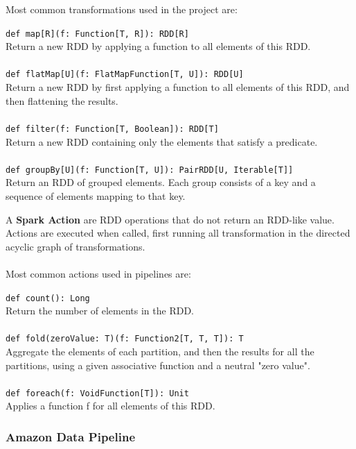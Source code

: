 Most common transformations used in the project are:

\begin{displayquote}
\texttt{def map[R](f: Function[T, R]): RDD[R]}
\\
Return a new RDD by applying a function to all elements of this RDD.
\\\\
\texttt{def flatMap[U](f: FlatMapFunction[T, U]): RDD[U]}
\\
Return a new RDD by first applying a function to all elements of this RDD, and then flattening the results.
\\\\
\texttt{def filter(f: Function[T, Boolean]): RDD[T]}
\\
Return a new RDD containing only the elements that satisfy a predicate.
\\\\
\texttt{def groupBy[U](f: Function[T, U]): PairRDD[U, Iterable[T]]}
\\
Return an RDD of grouped elements. Each group consists of a key and a sequence of elements mapping to that key.
\end{displayquote}

A \textbf{Spark Action} are RDD operations that do not return an RDD-like value. Actions are executed when called, first running all transformation in the directed acyclic graph of transformations.
\\\\
Most common actions used in pipelines are:

\begin{displayquote}
\texttt{def count(): Long}
\\
Return the number of elements in the RDD.
\\\\
\texttt{def fold(zeroValue: T)(f: Function2[T, T, T]): T}
\\
Aggregate the elements of each partition, and then the results for all the partitions, using a given associative function and a neutral "zero value".
\\\\
\texttt{def foreach(f: VoidFunction[T]): Unit}
\\
Applies a function f for all elements of this RDD.
\end{displayquote}

\subsubsection{Amazon Data Pipeline} \label{data_pipeline}

